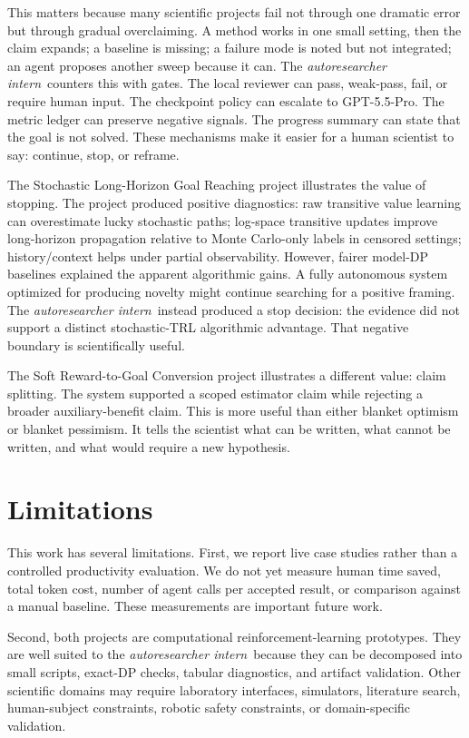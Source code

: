\documentclass{article}
\newcommand{\intern}{\emph{autoresearcher intern}}
\newcommand{\gptpro}{GPT-5.5-Pro}
\begin{document}
This matters because many scientific projects fail not through one dramatic error but through gradual overclaiming. A method works in one small setting, then the claim expands; a baseline is missing; a failure mode is noted but not integrated; an agent proposes another sweep because it can. The \intern\ counters this with gates. The local reviewer can pass, weak-pass, fail, or require human input. The checkpoint policy can escalate to \gptpro. The metric ledger can preserve negative signals. The progress summary can state that the goal is not solved. These mechanisms make it easier for a human scientist to say: continue, stop, or reframe.

The Stochastic Long-Horizon Goal Reaching project illustrates the value of stopping. The project produced positive diagnostics: raw transitive value learning can overestimate lucky stochastic paths; log-space transitive updates improve long-horizon propagation relative to Monte Carlo-only labels in censored settings; history/context helps under partial observability. However, fairer model-DP baselines explained the apparent algorithmic gains. A fully autonomous system optimized for producing novelty might continue searching for a positive framing. The \intern\ instead produced a stop decision: the evidence did not support a distinct stochastic-TRL algorithmic advantage. That negative boundary is scientifically useful.

The Soft Reward-to-Goal Conversion project illustrates a different value: claim splitting. The system supported a scoped estimator claim while rejecting a broader auxiliary-benefit claim. This is more useful than either blanket optimism or blanket pessimism. It tells the scientist what can be written, what cannot be written, and what would require a new hypothesis.

\section{Limitations}

This work has several limitations. First, we report live case studies rather than a controlled productivity evaluation. We do not yet measure human time saved, total token cost, number of agent calls per accepted result, or comparison against a manual baseline. These measurements are important future work.

Second, both projects are computational reinforcement-learning prototypes. They are well suited to the \intern\ because they can be decomposed into small scripts, exact-DP checks, tabular diagnostics, and artifact validation. Other scientific domains may require laboratory interfaces, simulators, literature search, human-subject constraints, robotic safety constraints, or domain-specific validation.
\end{document}
